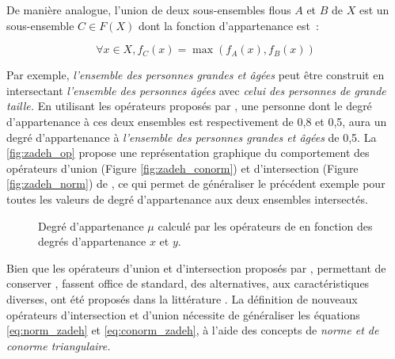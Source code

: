 De manière analogue, l’union de deux sous-ensembles flous $A$ et $B$
de $X$ est un sous-ensemble $C ∈ F(X)$ dont la fonction d’appartenance
est :

\begin{equation}
  \label{eq:conorm_zadeh}
  ∀x ∈ X, f_C (x) = \max(f_A(x), f_B(x))
\end{equation}

Par exemple, \emph{l’ensemble des personnes grandes et âgées} peut
être construit en intersectant \emph{l’ensemble des personnes âgées}
avec \emph{celui des personnes de grande taille.} En utilisant les
opérateurs proposés par \textcite{Zadeh1965}, une personne dont le
degré d’appartenance à ces deux ensembles est respectivement de 0,8 et
0,5, aura un degré d’appartenance à \emph{l’ensemble des personnes
  grandes et âgées} de 0,5. La \autoref{fig:zadeh_op} propose une
représentation graphique du comportement des opérateurs d'union
(Figure \ref{fig:zadeh_conorm}) et d'intersection (Figure
\ref{fig:zadeh_norm}) de \textcite{Zadeh1965}, ce qui permet de
généraliser le précédent exemple pour toutes les valeurs de degré
d'appartenance aux deux ensembles intersectés.

\begin{figure}[hb]
  \begin{center}
     \hfill {}
    \caption{Degré d'appartenance \(\mu\) calculé par les opérateurs
      de \textcite{Zadeh1965} en fonction des degrés d'appartenance
      \(x\) et \(y\).}
    \label{fig:zadeh_op}
  \end{center}
\end{figure}

Bien que les opérateurs d’union et d’intersection proposés par
\textcite{Zadeh1965}, permettant de conserver
, fassent office de standard, des
alternatives, aux caractéristiques diverses, ont été proposés dans la
littérature \autocite{Klir1995,Bouchon-Meunier1995}. La définition de
nouveaux opérateurs d'intersection et d'union nécessite de généraliser
les équations \ref{eq:norm_zadeh} et \ref{eq:conorm_zadeh}, à l'aide
des concepts de \emph{norme \emph{et de} conorme triangulaire.}

